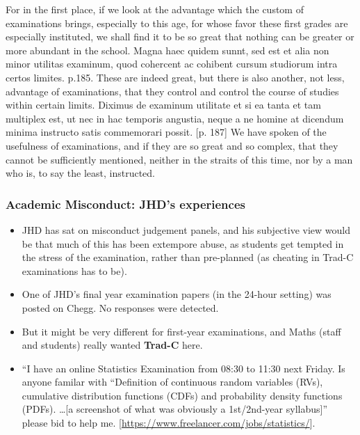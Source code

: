 For in the first place, if we look at the advantage which the custom of examinations brings, especially to this age, for whose favor these first grades are especially instituted, we shall find it to be so great that nothing can be greater or more abundant in the school.
Magna haec quidem sunnt, sed est et alia non minor utilitas examinum, quod cohercent ac cohibent cursum studiorum intra certos limites. p.185.
These are indeed great, but there is also another, not less, advantage of examinations, that they control and control the course of studies within certain limits.
Diximus de examinum utilitate et si ea tanta et tam multiplex est, ut nec in hac temporis angustia, neque a ne homine at dicendum minima instructo satis commemorari possit. [p. 187]
We have spoken of the usefulness of examinations, and if they are so great and so complex, that they cannot be sufficiently mentioned, neither in the straits of this time, nor by a man who is, to say the least, instructed.
\fi
\begin{frame}[fragile]
\frametitle{Academic Misconduct: JHD's experiences}
\pause
\begin{itemize}[<+->]
\item JHD has sat on misconduct judgement panels, and his subjective view would be that much of this has been extempore abuse, as students get tempted in the stress of the examination, rather than pre-planned (as cheating in Trad-C examinations has to be).
\item One of JHD's final year examination papers (in the 24-hour setting) was posted on Chegg. No responses were detected.
\item[\dbend]But it might be very different for first-year examinations, and Maths (staff and students) really wanted {\bf Trad-C} here.
\item ``I have an online Statistics Examination from 08:30 to 11:30 next Friday. Is anyone familar with ``Definition of continuous random variables (RVs), cumulative distribution functions (CDFs) and probability density functions (PDFs).
\dots [a screenshot of what was obviously a 1st/2nd-year syllabus]'' please bid to help me. [\url{https://www.freelancer.com/jobs/statistics/}].
\end{itemize}
\end{frame}
